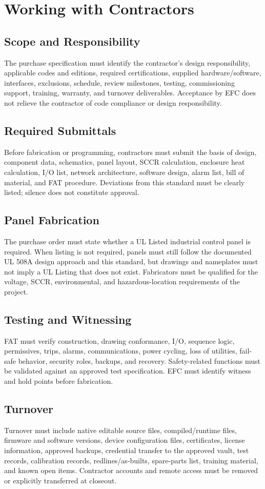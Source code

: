 \chapter{Working with Contractors}
\section{Scope and Responsibility}
The purchase specification must identify the contractor's design responsibility, applicable codes and editions, required certifications, supplied hardware/software, interfaces, exclusions, schedule, review milestones, testing, commissioning support, training, warranty, and turnover deliverables. Acceptance by EFC does not relieve the contractor of code compliance or design responsibility.

\section{Required Submittals}
Before fabrication or programming, contractors must submit the basis of design, component data, schematics, panel layout, SCCR calculation, enclosure heat calculation, I/O list, network architecture, software design, alarm list, bill of material, and FAT procedure. Deviations from this standard must be clearly listed; silence does not constitute approval.

\section{Panel Fabrication}
The purchase order must state whether a UL Listed industrial control panel is required. When listing is not required, panels must still follow the documented UL 508A design approach and this standard, but drawings and nameplates must not imply a UL Listing that does not exist. Fabricators must be qualified for the voltage, SCCR, environmental, and hazardous-location requirements of the project.

\section{Testing and Witnessing}
FAT must verify construction, drawing conformance, I/O, sequence logic, permissives, trips, alarms, communications, power cycling, loss of utilities, fail-safe behavior, security roles, backups, and recovery. Safety-related functions must be validated against an approved test specification. EFC must identify witness and hold points before fabrication.

\section{Turnover}
Turnover must include native editable source files, compiled/runtime files, firmware and software versions, device configuration files, certificates, license information, approved backups, credential transfer to the approved vault, test records, calibration records, redlines/as-builts, spare-parts list, training material, and known open items. Contractor accounts and remote access must be removed or explicitly transferred at closeout.
